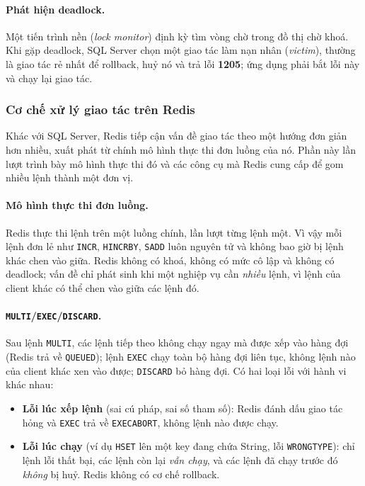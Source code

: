 \paragraph{Phát hiện deadlock.} Một tiến trình nền (\emph{lock monitor}) định kỳ tìm vòng chờ trong đồ thị chờ khoá. Khi gặp deadlock, SQL Server chọn một giao tác làm nạn nhân (\emph{victim}), thường là giao tác rẻ nhất để rollback, huỷ nó và trả lỗi \textbf{1205}; ứng dụng phải bắt lỗi này và chạy lại giao tác.

\subsubsection{Cơ chế xử lý giao tác trên Redis}
\label{subsubsec:tx-redis}

Khác với SQL Server, Redis tiếp cận vấn đề giao tác theo một hướng đơn giản hơn nhiều, xuất phát từ chính mô hình thực thi đơn luồng của nó. Phần này lần lượt trình bày mô hình thực thi đó và các công cụ mà Redis cung cấp để gom nhiều lệnh thành một đơn vị.

\paragraph{Mô hình thực thi đơn luồng.} Redis thực thi lệnh trên một luồng chính, lần lượt từng lệnh một. Vì vậy mỗi lệnh đơn lẻ như \texttt{INCR}, \texttt{HINCRBY}, \texttt{SADD} luôn nguyên tử và không bao giờ bị lệnh khác chen vào giữa. Redis không có khoá, không có mức cô lập và không có deadlock; vấn đề chỉ phát sinh khi một nghiệp vụ cần \emph{nhiều} lệnh, vì lệnh của client khác có thể chen vào giữa các lệnh đó.

\paragraph{\texttt{MULTI}/\texttt{EXEC}/\texttt{DISCARD}.} Sau lệnh \texttt{MULTI}, các lệnh tiếp theo không chạy ngay mà được xếp vào hàng đợi (Redis trả về \texttt{QUEUED}); lệnh \texttt{EXEC} chạy toàn bộ hàng đợi liên tục, không lệnh nào của client khác xen vào được; \texttt{DISCARD} bỏ hàng đợi. Có hai loại lỗi với hành vi khác nhau:

\begin{itemize}
    \item \textbf{Lỗi lúc xếp lệnh} (sai cú pháp, sai số tham số): Redis đánh dấu giao tác hỏng và \texttt{EXEC} trả về \texttt{EXECABORT}, không lệnh nào được chạy.
    \item \textbf{Lỗi lúc chạy} (ví dụ \texttt{HSET} lên một key đang chứa String, lỗi \texttt{WRONGTYPE}): chỉ lệnh lỗi thất bại, các lệnh còn lại \emph{vẫn chạy}, và các lệnh đã chạy trước đó \emph{không} bị huỷ. Redis không có cơ chế rollback.
\end{itemize}

